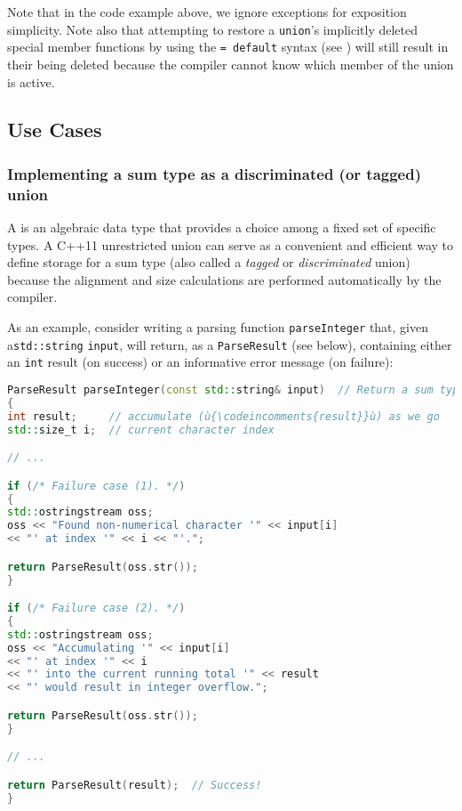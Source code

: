 Note that in the code example above, we ignore exceptions for exposition simplicity. Note also that attempting to
restore a \lstinline!union!'s implicitly deleted special member
functions by using the \lstinline!=!~\lstinline!default! syntax (see
) will still result in their being deleted because
the compiler cannot know which member of the union is active.

\subsection[Use Cases]{Use Cases}\label{unrestrictedunion-use-cases}

\subsubsection[Implementing a \romeogloss{sum type} as a discriminated (or tagged) {\tt union}]{Implementing a sum type as a discriminated (or tagged) {\SubsubsecCode union}}\label{implementing-a-sum-type-as-a-discriminating-(or-tagged)-union}

A  is an algebraic data type that provides a choice
among a fixed set of specific types. A C++11 unrestricted union can serve as a convenient and efficient way to define storage for a sum type (also called a \emph{tagged} or \emph{discriminated} union) because the alignment and size calculations are performed automatically by the compiler.

As an example, consider writing a parsing function \lstinline!parseInteger!
that, given a\linebreak[4] \lstinline!std::string! \lstinline!input!, will return, as a
 \lstinline!ParseResult! (see below), containing either an
\lstinline!int! result (on success) or an informative error message
(on failure):

\begin{lstlisting}[language=C++]
ParseResult parseInteger(const std::string& input)  // Return a sum type.
{
int result;     // accumulate (ù{\codeincomments{result}}ù) as we go
std::size_t i;  // current character index

// ...

if (/* Failure case (1). */)
{
std::ostringstream oss;
oss << "Found non-numerical character '" << input[i]
<< "' at index '" << i << "'.";

return ParseResult(oss.str());
}

if (/* Failure case (2). */)
{
std::ostringstream oss;
oss << "Accumulating '" << input[i]
<< "' at index '" << i
<< "' into the current running total '" << result
<< "' would result in integer overflow.";

return ParseResult(oss.str());
}

// ...

return ParseResult(result);  // Success!
}
\end{lstlisting}

